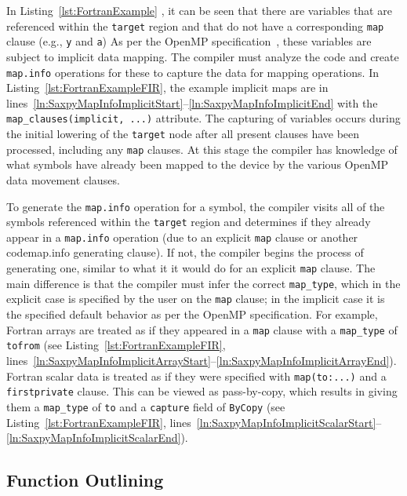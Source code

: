 \documentclass[acmtog,natbib=false]{acmart}
\newcommand{\code}[1]{\texttt{#1}\xspace}
\begin{document}
In Listing~\ref{lst:FortranExample}
, it can be seen that there are variables that are referenced within the \code{target} region and that do not have a corresponding \code{map} clause (e.g., \code{y} and \code{a})
As per the OpenMP specification~\cite{OARB24}, these variables are subject to implicit data mapping.
The compiler must analyze the code and create \code{map.info} operations for these to capture the data for mapping operations. 
In Listing~\ref{lst:FortranExampleFIR}, the example implicit maps are in lines~\ref{ln:SaxpyMapInfoImplicitStart}--\ref{ln:SaxpyMapInfoImplicitEnd} with the \code{map\_clauses(implicit, ...)} attribute.
The capturing of variables occurs during the initial lowering of the \code{target} node after all present clauses have been processed, including any \code{map} clauses. 
At this stage the compiler has knowledge of what symbols have already been mapped to the device by the various OpenMP data movement clauses.

To generate the \code{map.info} operation for a symbol, the compiler visits all of the symbols referenced within the \code{target} region and determines if they already appear in a \code{map.info} operation (due to an explicit \code{map} clause or another code{map.info} generating clause). 
If not, the compiler begins the process of generating one, similar to what it it would do for an explicit \code{map} clause.
The main difference is that the compiler must infer the correct \code{map\_type}, which in the explicit case is specified by the user on the \code{map} clause; in the implicit case it is the specified default behavior as per the OpenMP specification.
For example, Fortran arrays are treated as if they appeared in a \code{map} clause with a \code{map\_type} of \code{tofrom} (see Listing~\ref{lst:FortranExampleFIR}, lines~\ref{ln:SaxpyMapInfoImplicitArrayStart}--\ref{ln:SaxpyMapInfoImplicitArrayEnd}).
Fortran scalar data is treated as if they were specified with \code{map(to:...)} and a \code{firstprivate} clause.
This can be viewed as pass-by-copy, which results in giving them a \code{map\_type} of \code{to} and a \code{capture} field of \code{ByCopy} (see Listing~\ref{lst:FortranExampleFIR}, lines~\ref{ln:SaxpyMapInfoImplicitScalarStart}--\ref{ln:SaxpyMapInfoImplicitScalarEnd}). 

\subsection{Function Outlining}
\label{sec:FunctionOutlining}
\end{document}
